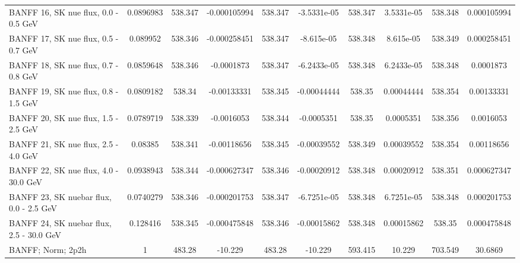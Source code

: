 \documentclass{standalone}
\begin{document}
\begin{tabular}{| l | S | S  S | S  S | S  S | S  S | }
                                            BANFF 16, SK nue flux, 0.0 - 0.5 GeV &       0.0896983 &         538.347 &    -0.000105994 &         538.347 &     -3.5331e-05 &         538.347 &      3.5331e-05 &         538.348 &     0.000105994 \\ 
                                            BANFF 17, SK nue flux, 0.5 - 0.7 GeV &        0.089952 &         538.346 &    -0.000258451 &         538.347 &      -8.615e-05 &         538.348 &       8.615e-05 &         538.349 &     0.000258451 \\ 
                                            BANFF 18, SK nue flux, 0.7 - 0.8 GeV &       0.0859648 &         538.346 &      -0.0001873 &         538.347 &     -6.2433e-05 &         538.348 &      6.2433e-05 &         538.348 &       0.0001873 \\ 
                                            BANFF 19, SK nue flux, 0.8 - 1.5 GeV &       0.0809182 &          538.34 &     -0.00133331 &         538.345 &     -0.00044444 &          538.35 &      0.00044444 &         538.354 &      0.00133331 \\ 
                                            BANFF 20, SK nue flux, 1.5 - 2.5 GeV &       0.0789719 &         538.339 &      -0.0016053 &         538.344 &      -0.0005351 &          538.35 &       0.0005351 &         538.356 &       0.0016053 \\ 
                                            BANFF 21, SK nue flux, 2.5 - 4.0 GeV &         0.08385 &         538.341 &     -0.00118656 &         538.345 &     -0.00039552 &         538.349 &      0.00039552 &         538.354 &      0.00118656 \\ 
                                           BANFF 22, SK nue flux, 4.0 - 30.0 GeV &       0.0938943 &         538.344 &    -0.000627347 &         538.346 &     -0.00020912 &         538.348 &      0.00020912 &         538.351 &     0.000627347 \\ 
                                         BANFF 23, SK nuebar flux, 0.0 - 2.5 GeV &       0.0740279 &         538.346 &    -0.000201753 &         538.347 &     -6.7251e-05 &         538.348 &      6.7251e-05 &         538.348 &     0.000201753 \\ 
                                        BANFF 24, SK nuebar flux, 2.5 - 30.0 GeV &        0.128416 &         538.345 &    -0.000475848 &         538.346 &     -0.00015862 &         538.348 &      0.00015862 &          538.35 &     0.000475848 \\ 
                                                               BANFF; Norm; 2p2h &               1 &          483.28 &         -10.229 &          483.28 &         -10.229 &         593.415 &          10.229 &         703.549 &         30.6869 \\ 

\end{tabular}
\end{document}
